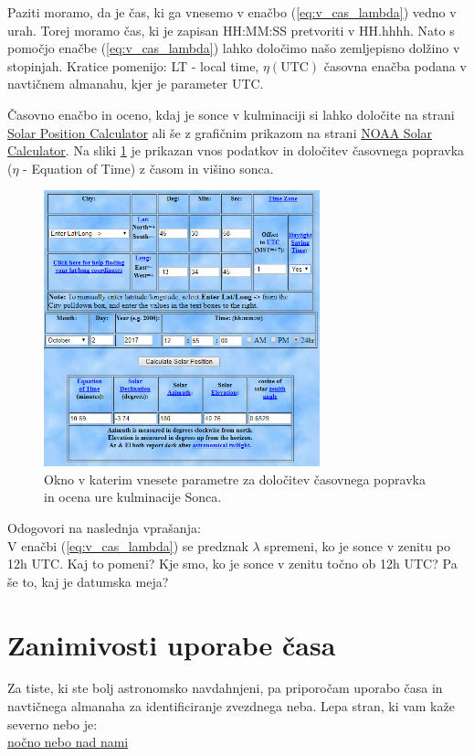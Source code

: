\documentclass[11pt]{article}
\begin{document}
Paziti moramo, da je čas, ki ga vnesemo v enačbo (\ref{eq:v_cas_lambda}) vedno v urah. Torej moramo čas, ki je zapisan HH:MM:SS pretvoriti v HH.hhhh. Nato s pomočjo enačbe (\ref{eq:v_cas_lambda}) lahko določimo našo zemljepisno dolžino v stopinjah. Kratice pomenijo: LT - local time, $\eta(\text{UTC})$ časovna enačba podana v navtičnem almanahu, kjer je parameter UTC.

Časovno enačbo in oceno, kdaj je sonce v kulminaciji si lahko določite na strani \href{https://www.esrl.noaa.gov/gmd/grad/solcalc/azel.html}{Solar Position Calculator} ali še z grafičnim prikazom na strani \href{https://www.esrl.noaa.gov/gmd/grad/solcalc/}{NOAA Solar Calculator}. Na sliki \ref{fig:v_cas_calculator} je prikazan vnos podatkov in določitev časovnega popravka ($\eta$ - Equation of Time) z časom in višino sonca.
%
\begin{figure}[tbph!]
	\centering \includegraphics[width=8cm]{figs/calculator.png}
	\caption{Okno v katerim vnesete parametre za določitev časovnega popravka in ocena ure kulminacije Sonca.}
	\label{fig:v_cas_calculator}
\end{figure}

%
Odogovori na naslednja vprašanja:\\[2mm]
V enačbi (\ref{eq:v_cas_lambda}) se predznak $\lambda$ spremeni, ko je sonce v zenitu po 12h UTC. Kaj to pomeni? Kje smo, ko je sonce v zenitu točno ob 12h UTC? Pa še to, kaj je datumska meja?

\section{Zanimivosti uporabe časa}
Za tiste, ki ste bolj astronomsko navdahnjeni, pa priporočam uporabo časa in navtičnega almanaha za identificiranje zvezdnega neba. Lepa stran, ki vam kaže severno nebo je:\\[2mm]
%
\href{http://www.jodcast.net/sky}{nočno nebo nad nami}
%
\end{document}
